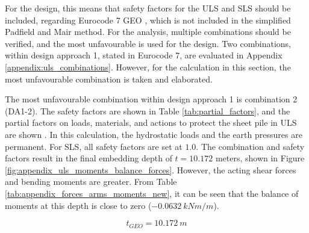 For the design, this means that safety factors for the ULS and SLS should be included, regarding Eurocode 7 GEO \autocite{eurocodeGeotechnicalDesignStructures2025}, which is not included in the simplified Padfield and Mair method. For the analysis, multiple combinations should be verified, and the most unfavourable is used for the design. Two combinations, within design approach 1, stated in Eurocode 7, are evaluated in Appendix \ref{appendix:uls_combinations}. However, for the calculation in this section, the most unfavourable combination is taken and elaborated.

The most unfavourable combination within design approach 1 is combination 2 (DA1-2). The safety factors are shown in Table \ref{tab:partial_factors}, and the partial factors on loads, materials, and actions to protect the sheet pile in ULS are shown \autocite{eurocodeGeotechnicalDesignStructures2025}. In this calculation, the hydrostatic loads and the earth pressures are permanent. For SLS, all safety factors are set at $1.0$. The combination and safety factors result in the final embedding depth of $t = 10.172$ meters,  shown in Figure \ref{fig:appendix_uls_moments_balance_forces}. However, the acting shear forces and bending moments are greater. From Table \ref{tab:appendix_forces_arms_moments_new}, it can be seen that the balance of moments at this depth is close to zero ($-0.0632 \ kNm/m$).

\begin{equation}
    t_{GEO} = 10.172 \ m
\end{equation}

